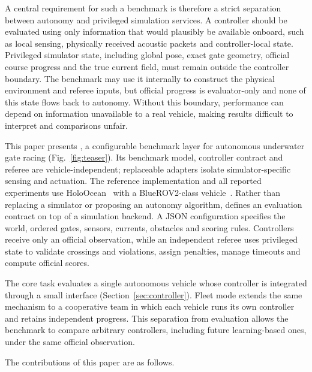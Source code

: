 A central requirement for such a benchmark is therefore a strict separation between autonomy and privileged simulation services. A controller should be evaluated using only information that would plausibly be available onboard, such as local sensing, physically received acoustic packets and controller-local state. Privileged simulator state, including global pose, exact gate geometry, official course progress and the true current field, must remain outside the controller boundary. The benchmark may use it internally to construct the physical environment and referee inputs, but official progress is evaluator-only and none of this state flows back to autonomy. Without this boundary, performance can depend on information unavailable to a real vehicle, making results difficult to interpret and comparisons unfair.

This paper presents \mra{}, a configurable benchmark layer for autonomous underwater gate racing (Fig.~\ref{fig:teaser}). Its benchmark model, controller contract and referee are vehicle-independent; replaceable adapters isolate simulator-specific sensing and actuation. The reference implementation and all reported experiments use HoloOcean~\cite{potokar2022holoocean} with a BlueROV2-class vehicle~\cite{vonbenzon2022bluerov2}. Rather than replacing a simulator or proposing an autonomy algorithm, \mra{} defines an evaluation contract on top of a simulation backend. A JSON configuration specifies the world, ordered gates, sensors, currents, obstacles and scoring rules. Controllers receive only an official observation, while an independent referee uses privileged state to validate crossings and violations, assign penalties, manage timeouts and compute official scores.

The core task evaluates a single autonomous vehicle whose controller is integrated through a small interface (Section~\ref{sec:controller}). Fleet mode extends the same mechanism to a cooperative team in which each vehicle runs its own controller and retains independent progress. This separation from evaluation allows the benchmark to compare arbitrary controllers, including future learning-based ones, under the same official observation.

The contributions of this paper are as follows.

